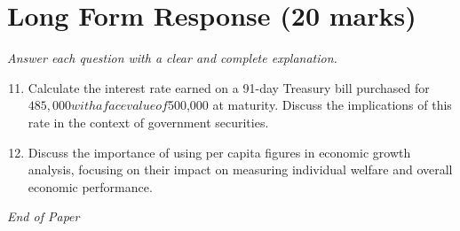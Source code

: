\documentclass[12pt]{article}
\begin{document}
\section*{Long Form Response (20 marks)}
\textit{Answer each question with a clear and complete explanation.}
\begin{enumerate}[label=\arabic*.]
\setcounter{enumi}{10}
\item Calculate the interest rate earned on a 91-day Treasury bill purchased for $485,000 with a
face value of $500,000 at maturity. Discuss the implications of this rate in the context
of government securities.
\item Discuss the importance of using per capita figures in economic growth analysis, focusing
on their impact on measuring individual welfare and overall economic performance.
\end{enumerate}

\vfill
\noindent\textit{End of Paper}
\end{document}
